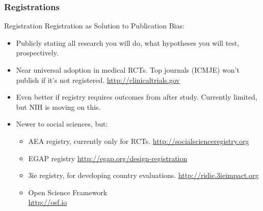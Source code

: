 \documentclass{beamer}
\begin{document}


\subsubsection*{Registrations}
\begin{frame}{Registration}
Registration as Solution to Publication Bias:
 \begin{itemize}
  \item
   Publicly stating all research you will do, what hypotheses you will test, prospectively.
  \item
   Near universal adoption in medical RCTs. Top journals (ICMJE) won't publish if it's not registered. \url{http://clinicaltrials.gov}
  \item
   Even better if registry requires outcomes from after study. Currently limited, but NIH is moving on this.
   \item Newer to social sciences, but:
   \begin{itemize}[<.->]
   \item
   	AEA registry, currently only for RCTs. \url{http://socialscienceregistry.org}
   \item
    EGAP registry \url{http://egap.org/design-registration}
   \item 
    3ie registry, for developing country evaluations. \url{http://ridie.3ieimpact.org}
   \item
   	Open Science Framework\\ \url{http://osf.io}
   \end{itemize}
  \end{itemize}  
\end{frame}
\end{document}
